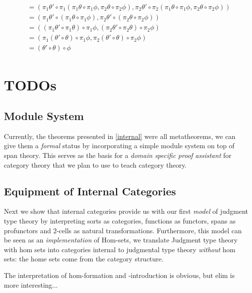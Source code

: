 \documentclass{article}
\begin{document}
\begin{definition}
\begin{enumerate}
\begin{align*}
      &= (\pi_1 \theta' \circ \pi_1(\pi_1 \theta \circ \pi_1 \phi, \pi_2 \theta \circ \pi_2 \phi),
      \pi_2 \theta' \circ \pi_2(\pi_1 \theta \circ \pi_1 \phi, \pi_2 \theta \circ \pi_2 \phi))\\
      &= (\pi_1 \theta' \circ (\pi_1 \theta \circ \pi_1 \phi), \pi_2 \theta' \circ (\pi_2 \theta \circ \pi_2 \phi))\\
      &= ((\pi_1 \theta' \circ \pi_1 \theta) \circ \pi_1 \phi, (\pi_2 \theta' \circ \pi_2 \theta) \circ \pi_2 \phi)\\
      &= (\pi_1(\theta' \circ \theta) \circ \pi_1 \phi, \pi_2(\theta' \circ \theta) \circ \pi_2 \phi)\\
      &= (\theta' \circ \theta) \circ \phi \\
    \end{align*}
  \end{enumerate}
\end{definition}

\section{TODOs}


\subsection{Module System}

Currently, the theorems presented in \ref{internal} were all
metatheorems, we can give them a \emph{formal} status by incorporating
a simple module system on top of span theory.
%
This serves as the basis for a \emph{domain specific proof assistant}
for category theory that we plan to use to teach category theory.


\subsection{Equipment of Internal Categories}

Next we show that internal categories provide us with our first
\emph{model} of judgment type theory by interpreting sorts as
categories, functions as functors, spans as profunctors and 2-cells as
natural transformations.
%
Furthermore, this model can be seen as an \emph{implementation} of
Hom-sets, we translate Judgment type theory with hom sets into
categories internal to judgmental type theory \emph{without} hom sets:
the home sets come from the category structure.

The interpretation of hom-formation and -introduction is obvious, but
elim is more interesting...
\end{document}
